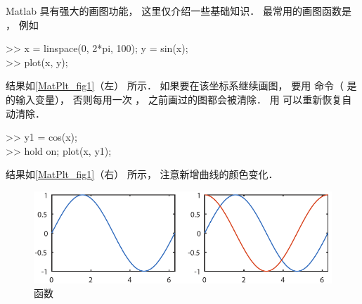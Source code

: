 

Matlab 具有强大的画图功能， 这里仅介绍一些基础知识． 最常用的画图函数是 ， 例如
\begin{Command}
>> x = linspace(0, 2*pi, 100); y = sin(x);\\
>> plot(x, y);
\end{Command}
结果如\autoref{MatPlt_fig1}（左） 所示． 如果要在该坐标系继续画图， 要用  命令（ 是  的输入变量）， 否则每用一次 ， 之前画过的图都会被清除． 用  可以重新恢复自动清除．
\begin{Command}
>> y1 = cos(x);\\
>> hold on; plot(x, y1);
\end{Command}
结果如\autoref{MatPlt_fig1}（右） 所示， 注意新增曲线的颜色变化．
\begin{figure}[ht]
\centering
\includegraphics[width=13cm]{./figures/MatPlt1.pdf}
\caption{ 函数} \label{MatPlt_fig1}
\end{figure}

